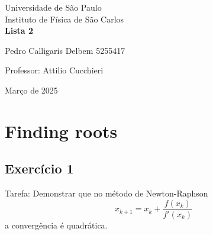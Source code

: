\documentclass[12pt, a4paper]{article} %
\begin{document}
	
	\begin{titlepage}
		\begin{center}
\Huge{Universidade de São Paulo}\\
\large{Instituto de Física de São Carlos}\\
\vspace{20pt}
\vspace{200pt}
\textbf{Lista 2}\\
\vspace{8cm}
		\end{center}

\begin{flushleft}
\begin{tabbing}
Pedro Calligaris Delbem 5255417\\
\end{tabbing}
\vspace{0.5cm}
Professor: Attilio Cucchieri\\		
		\end{flushleft}
	
		\begin{center}
			\vspace{\fill}
	Março de 2025	
		\end{center}
	\end{titlepage}

	\tableofcontents 
	\thispagestyle{empty}
	\newpage

\section{Finding roots}

    \subsection{Exerc\'icio 1}

        Tarefa: Demonstrar que no m\'etodo de Newton-Raphson
        \begin{equation}
            x_{k+1} = x_{k} + \frac{f(x_{k})}{f'(x_{k})}
        \end{equation}
        a converg\^encia \'e quadr\'atica.
\end{document}
